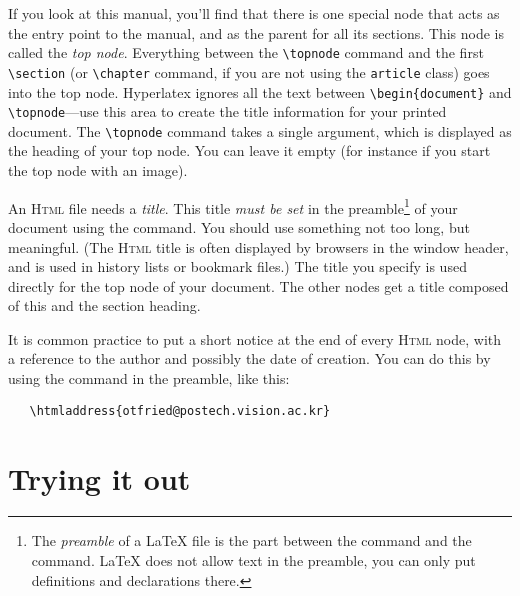 \documentclass[a4paper]{article}
\newcommand{\+}{\verb+}
\renewcommand{\=}{\back{}}
\newcommand{\Html}{\textsc{Html}\xspace }
\newcommand{\latex}{\LaTeX\xspace }
\begin{document}
\label{topnode}
If you look at \texonly{the \Html output for} this manual, you'll find
that there is one special node that acts as the entry point to the
manual, and as the parent for all its sections. This node is called
the \emph{top node}.  Everything between the \+\topnode+ command and
the first \+\section+ (or \+\chapter+ command, if you are not using
the \texttt{article} class) goes into the top node. Hyperlatex ignores
all the text between \+\+\+begin{document}+ and \+\topnode+---use this
area to create the title information for your printed document. The
\+\topnode+ command takes a single argument, which is displayed as the
heading of your top node. You can leave it empty (for instance if you
start the top node with an image).
  
\label{htmltitle}
\label{preamble}
An \Html file needs a \emph{title}. This title {\em must be set\/} in
the preamble\footnote{\label{footnote-preamble}The \emph{preamble} of
  a \latex file is the part between the 
  command and the  command.  \latex
  does not allow text in the preamble, you can only put definitions
  and declarations there.} of your document using the
 command. You should use something not too
long, but meaningful. (The \Html title is often displayed by browsers
in the window header, and is used in history lists or bookmark files.)
The title you specify is used directly for the top node of your
document. The other nodes get a title composed of this and the section
heading.

\label{htmladdress}
 It is common practice
to put a short notice at the end of every \Html node, with a reference
to the author and possibly the date of creation. You can do this by
using the  command in the preamble, like
this:
\begin{verbatim}
   \htmladdress{otfried@postech.vision.ac.kr}
\end{verbatim}

\section{Trying it out}
\label{sec:trying-it-out}
\end{document}
